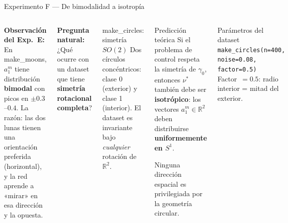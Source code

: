 \documentclass[10pt]{beamer}
\begin{document}
\begin{frame}{Experimento F — De bimodalidad a isotropía}
\small
\begin{columns}

\textbf{Observación del Exp.\ E:}\\
En make\_moons, $a_1^m$ tiene distribución \textbf{bimodal} con picos en $\pm 0.3$--$0.4$. La razón: las dos lunas tienen una orientación preferida (horizontal), y la red aprende a «mirar» en esa dirección y la opuesta.

\bigskip
\textbf{Pregunta natural:}\\
¿Qué ocurre con un dataset que tiene \textbf{simetría rotacional completa}?

\begin{block}{make\_circles: simetría $SO(2)$}
  Dos círculos concéntricos: clase 0 (exterior) y clase 1 (interior). El dataset es invariante bajo \emph{cualquier} rotación de $\mathbb{R}^2$.
\end{block}

\begin{alertblock}{Predicción teórica}
  Si el problema de control respeta la simetría de $\gamma_0$, entonces $\nu^*$ también debe ser \textbf{isotrópico}: los vectores $a_1^m\in\mathbb{R}^2$ deben distribuirse \textbf{uniformemente en $S^1$}.

  \medskip
  Ninguna dirección espacial es privilegiada por la geometría circular.
\end{alertblock}

\medskip
\begin{block}{Parámetros del dataset}
  \texttt{make\_circles(n=400, noise=0.08, factor=0.5)}\\
  Factor~$= 0.5$: radio interior = mitad del exterior.
\end{block}
\end{columns}

\end{frame}
\end{document}
